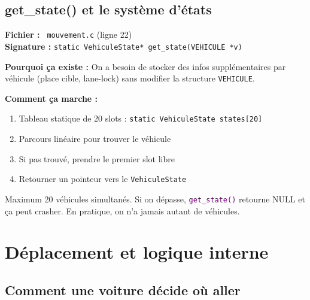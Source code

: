 \documentclass[11pt,a4paper]{article}
\newcommand{\code}[1]{\texttt{\textcolor{accent}{#1}}}
\newcommand{\fichier}[1]{\texttt{\textcolor{primary}{\faIcon{file-code} #1}}}
\newcommand{\fonction}[1]{\texttt{\textcolor{purple}{#1()}}}
\newcommand{\variable}[1]{\texttt{\textcolor{success}{#1}}}
\begin{document}
\subsection{get\_state() et le système d'états}

\begin{funcbox}
\textbf{Fichier :} \fichier{mouvement.c} (ligne 22)\\
\textbf{Signature :} \code{static VehiculeState* get\_state(VEHICULE *v)}
\end{funcbox}

\textbf{Pourquoi ça existe :}
On a besoin de stocker des infos supplémentaires par véhicule (place cible, lane-lock) sans modifier la structure \variable{VEHICULE}.

\textbf{Comment ça marche :}
\begin{enumerate}[noitemsep]
    \item Tableau statique de 20 slots : \code{static VehiculeState states[20]}
    \item Parcours linéaire pour trouver le véhicule
    \item Si pas trouvé, prendre le premier slot libre
    \item Retourner un pointeur vers le \variable{VehiculeState}
\end{enumerate}

\begin{warningbox}[Limite]
Maximum 20 véhicules simultanés. Si on dépasse, \fonction{get\_state} retourne NULL et ça peut crasher. En pratique, on n'a jamais autant de véhicules.
\end{warningbox}

\section{Déplacement et logique interne}

\subsection{Comment une voiture décide où aller}
\end{document}
